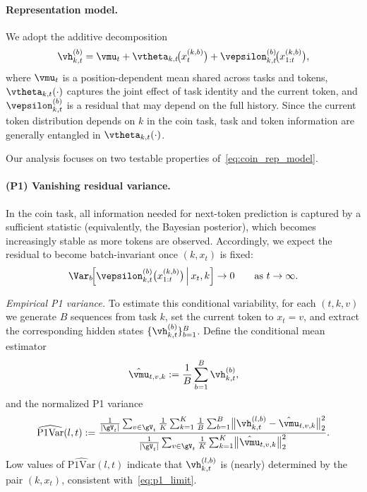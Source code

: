 \paragraph{Representation model.}
We adopt the additive decomposition
\begin{equation}
\label{eq:coin_rep_model}
\vh^{(b)}_{k,t}
= \vmu_t
+ \vtheta_{k,t}\!\bigl(x^{(k,b)}_t\bigr)
+ \vepsilon^{(b)}_{k,t}\!\bigl(x^{(k,b)}_{1:t}\bigr),
\end{equation}
where $\vmu_t$ is a position-dependent mean shared across tasks and tokens,
$\vtheta_{k,t}(\cdot)$ captures the joint effect of task identity and the
current token, and $\vepsilon^{(b)}_{k,t}$ is a residual that may depend on the
full history. Since the current token distribution depends on $k$ in the coin
task, task and token information are generally entangled in
$\vtheta_{k,t}(\cdot)$.

Our analysis focuses on two testable properties of~\eqref{eq:coin_rep_model}.

\paragraph{(P1) Vanishing residual variance.}
In the coin task, all information needed for next-token prediction is captured
by a sufficient statistic (equivalently, the Bayesian posterior), which becomes
increasingly stable as more tokens are observed. Accordingly, we expect the
residual to become batch-invariant once $(k, x_t)$ is fixed:
\begin{equation}
\label{eq:p1_limit}
\Var_b\!\Bigl[\vepsilon^{(b)}_{k,t}\bigl(x^{(k,b)}_{1:t}\bigr)\,\Big|\, x_t, k\Bigr]
\to 0
\qquad \text{as } t \to \infty .
\end{equation}

\emph{Empirical P1 variance.}
To estimate this conditional variability, for each $(t,k,v)$ we generate $B$
sequences from task $k$, set the current token to $x_t=v$, and extract the
corresponding hidden states $\{\vh^{(b)}_{k,t}\}_{b=1}^B$. Define the
conditional mean estimator
\[
\hat{\vmu}_{t,v,k} := \frac{1}{B}\sum_{b=1}^B \vh^{(b)}_{k,t},
\]
and the normalized P1 variance
\begin{equation}
\label{eq:p1var_def}
\widehat{\mathrm{P1Var}}(l,t)
:= \frac{
\frac{1}{|\gV_t|}\sum_{v\in\gV_t}\frac{1}{K}\sum_{k=1}^K
\frac{1}{B}\sum_{b=1}^B
\bigl\|\vh^{(l,b)}_{k,t}-\hat{\vmu}_{t,v,k}\bigr\|_2^2
}{
\frac{1}{|\gV_t|}\sum_{v\in\gV_t}\frac{1}{K}\sum_{k=1}^K
\bigl\|\hat{\vmu}_{t,v,k}\bigr\|_2^2
}.
\end{equation}
Low values of $\widehat{\mathrm{P1Var}}(l,t)$ indicate that $\vh^{(l,b)}_{k,t}$
is (nearly) determined by the pair $(k,x_t)$, consistent with~\eqref{eq:p1_limit}.

